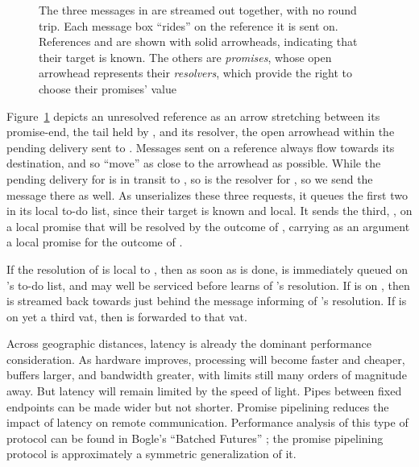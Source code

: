 \documentclass{llncs}
\begin{document}
\begin{figure}
\centerline{}
\caption{The three messages in  are streamed out together, with no round
trip. Each message box ``rides'' on the reference it is sent
on. References  and  are shown with solid arrowheads,
indicating that their target is known. The others are \emph{promises},
whose open arrowhead represents their \emph{resolvers}, which provide
the right to choose their promises' value}
\label{fig:pipeline}
\end{figure}

Figure~\ref{fig:pipeline} depicts an unresolved reference as an arrow
stretching between its promise-end, the tail held by , and its
resolver, the open arrowhead within the pending delivery sent to
. Messages sent on a reference always flow towards its
destination, and so ``move'' as close to the arrowhead as
possible. While the pending delivery for  is in transit to
, so is the resolver for , so we send the 
message there as well. As  unserializes these three requests,
it queues the first two in its local to-do list, since their target is
known and local. It sends the third, , on a local
promise that will be resolved by the outcome of , carrying
as an argument a local promise for the outcome of .

If the resolution of  is local to , then as soon as
 is done,  is immediately queued on 's
to-do list, and may well be serviced before  learns of
's resolution. If  is on , then  is
streamed back towards  just behind the message informing
 of 's resolution.  If  is on yet a third vat,
then  is forwarded to that vat.

Across geographic distances, latency is already the dominant
performance consideration. As hardware improves, processing will
become faster and cheaper, buffers larger, and bandwidth greater, with
limits still many orders of magnitude away. But latency will remain
limited by the speed of light. Pipes between fixed endpoints can be
made wider but not shorter. Promise pipelining reduces the impact of
latency on remote communication. Performance analysis of this type of
protocol can be found in Bogle's ``Batched Futures''
\cite{bogle:batched}; the promise pipelining protocol is approximately
a symmetric generalization of it.
\end{document}
